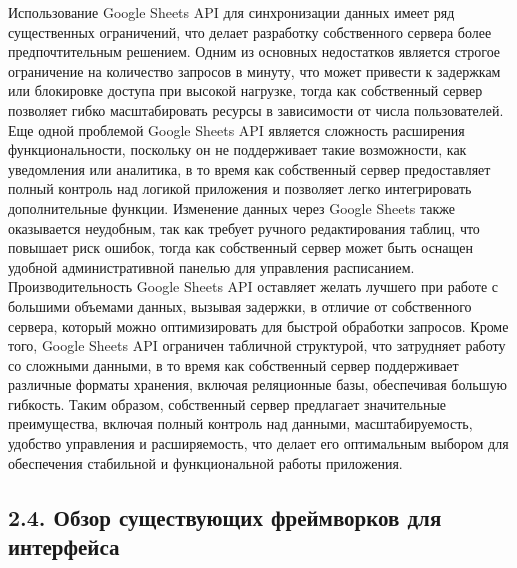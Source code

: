 \documentclass{vsureport}
\begin{document}
Использование Google Sheets API для синхронизации данных имеет ряд существенных ограничений, что делает разработку собственного сервера более предпочтительным решением. Одним из основных недостатков является строгое ограничение на количество запросов в минуту, что может привести к задержкам или блокировке доступа при высокой нагрузке, тогда как собственный сервер позволяет гибко масштабировать ресурсы в зависимости от числа пользователей.
Еще одной проблемой Google Sheets API является сложность расширения функциональности, поскольку он не поддерживает такие возможности, как уведомления или аналитика, в то время как собственный сервер предоставляет полный контроль над логикой приложения и позволяет легко интегрировать дополнительные функции.
Изменение данных через Google Sheets также оказывается неудобным, так как требует ручного редактирования таблиц, что повышает риск ошибок, тогда как собственный сервер может быть оснащен удобной административной панелью для управления расписанием.
Производительность Google Sheets API оставляет желать лучшего при работе с большими объемами данных, вызывая задержки, в отличие от собственного сервера, который можно оптимизировать для быстрой обработки запросов.
Кроме того, Google Sheets API ограничен табличной структурой, что затрудняет работу со сложными данными, в то время как собственный сервер поддерживает различные форматы хранения, включая реляционные базы, обеспечивая большую гибкость.
Таким образом, собственный сервер предлагает значительные преимущества, включая полный контроль над данными, масштабируемость, удобство управления и расширяемость, что делает его оптимальным выбором для обеспечения стабильной и функциональной работы приложения.

\subsection*{2.4. Обзор существующих фреймворков для интерфейса}
\end{document}

